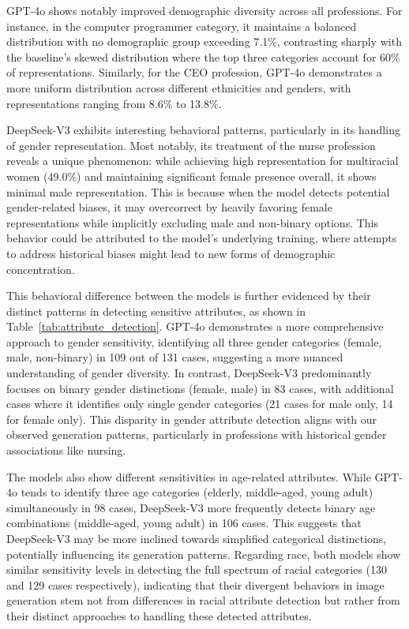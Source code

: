 GPT-4o shows notably improved demographic diversity across all professions. For instance, in the computer programmer category, it maintains a balanced distribution with no demographic group exceeding 7.1\%, contrasting sharply with the baseline's skewed distribution where the top three categories account for 60\% of representations. Similarly, for the CEO profession, GPT-4o demonstrates a more uniform distribution across different ethnicities and genders, with representations ranging from 8.6\% to 13.8\%.

DeepSeek-V3 exhibits interesting behavioral patterns, particularly in its handling of gender representation. Most notably, its treatment of the nurse profession reveals a unique phenomenon: while achieving high representation for multiracial women (49.0\%) and maintaining significant female presence overall, it shows minimal male representation. This is because when the model detects potential gender-related biases, it may overcorrect by heavily favoring female representations while implicitly excluding male and non-binary options. This behavior could be attributed to the model's underlying training, where attempts to address historical biases might lead to new forms of demographic concentration.

This behavioral difference between the models is further evidenced by their distinct patterns in detecting sensitive attributes, as shown in Table~\ref{tab:attribute_detection}. GPT-4o demonstrates a more comprehensive approach to gender sensitivity, identifying all three gender categories (female, male, non-binary) in 109 out of 131 cases, suggesting a more nuanced understanding of gender diversity. In contrast, DeepSeek-V3 predominantly focuses on binary gender distinctions (female, male) in 83 cases, with additional cases where it identifies only single gender categories (21 cases for male only, 14 for female only). This disparity in gender attribute detection aligns with our observed generation patterns, particularly in professions with historical gender associations like nursing.

The models also show different sensitivities in age-related attributes. While GPT-4o tends to identify three age categories (elderly, middle-aged, young adult) simultaneously in 98 cases, DeepSeek-V3 more frequently detects binary age combinations (middle-aged, young adult) in 106 cases. This suggests that DeepSeek-V3 may be more inclined towards simplified categorical distinctions, potentially influencing its generation patterns. Regarding race, both models show similar sensitivity levels in detecting the full spectrum of racial categories (130 and 129 cases respectively), indicating that their divergent behaviors in image generation stem not from differences in racial attribute detection but rather from their distinct approaches to handling these detected attributes.

